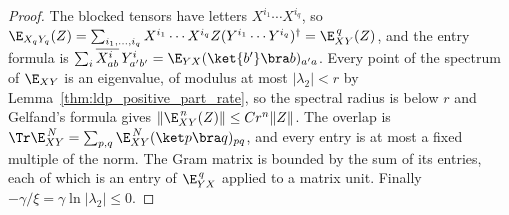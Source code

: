 \begin{proof}
    \leanok
    The blocked tensors have letters $X^{i_1}\cdots X^{i_q}$, so
    $\E_{X_qY_q}(Z)=\sum_{i_1,\dots,i_q}X^{i_1}\cdots X^{i_q}Z
        (Y^{i_1}\cdots Y^{i_q})^\dagger=\E_{XY}^{\,q}(Z)$, and the entry formula is
    $\sum_i\overline{X^i_{ab}}\,Y^i_{a'b'}=\E_{YX}(\ket{b'}\bra b)_{a'a}$. Every point of
    the spectrum of $\E_{XY}$ is an eigenvalue, of modulus at most
    $\lvert\lambda_2\rvert<r$ by Lemma~\ref{thm:ldp_positive_part_rate}, so the
    spectral radius is below $r$ and Gelfand's formula gives
    $\lVert\E_{XY}^{\,n}(Z)\rVert\leq Cr^n\lVert Z\rVert$. The overlap is
    $\Tr\E_{XY}^{\,N}=\sum_{p,q}\E_{XY}^{\,N}(\ket p\bra q)_{pq}$, and every entry is
    at most a fixed multiple of the norm. The Gram matrix is bounded by the sum of
    its entries, each of which is an entry of $\E_{YX}^{\,q}$ applied to a matrix
    unit. Finally $-\gamma/\xi=\gamma\ln\lvert\lambda_2\rvert\leq0$.
\end{proof}

